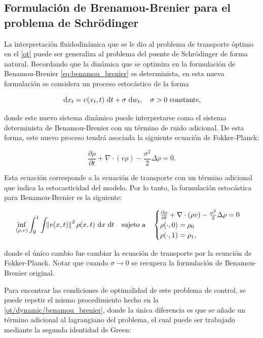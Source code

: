 \subsection{Formulación de Brenamou-Brenier para el problema de Schrödinger}
\label{eot_sbp/dynamic/schrodinger_equations}

La interpretación fluidodinámica que se le dio al problema de transporte óptimo en el \autoref{ot} puede ser generaliza al problema del puente de Schrödinger de forma natural. Recordando que la dinámica que se optimiza en la formulación de Benamou-Brenier \eqref{eq:benamou_brenier} es determinista, en esta nueva formulación se considera un proceso estocástico de la forma

\begin{equation*}
	\,\operatorname{d}\! x_t = v(x_t,t)\,\operatorname{d}\! t + \sigma\,\operatorname{d}\! w_t, \quad \sigma>0\text{ constante},
\end{equation*}

donde este nuevo sistema dinámico puede interpretarse como el sistema determinista de Benamou-Brenier con un término de ruido adicional. De esta forma, este nuevo proceso tendrá asociada la siguiente ecuación de Fokker-Planck:

\begin{equation*}
	\frac{\partial\rho}{\partial t} + \nabla\cdot(v\rho) - \frac{\sigma^2}{2}\Delta\rho = 0.
\end{equation*}

Esta ecuación corresponde a la ecuación de transporte con un término adicional que indica la estocasticidad del modelo. Por lo tanto, la formulación estocástica para Benamou-Brenier es la siguiente:

\begin{equation}
	\label{eq:benamou_brenier_sbp}
	\inf_{(\rho,v)} \int_0^1 \int_{} \left\lVert v(x,t) \right\rVert^2 \rho(x,t) \,\operatorname{d}\! x\,\operatorname{d}\! t
	\quad \text{sujeto a} \quad
	\begin{cases}
		\frac{\partial \rho}{\partial t} + \nabla\cdot(\rho v) - \frac{\sigma^2}{2}\Delta\rho = 0\\
		\rho(\cdot,0) = \rho_0\\
		\rho(\cdot,1) = \rho_1,
	\end{cases}
\end{equation}

donde el único cambio fue cambiar la ecuación de transporte por la ecuación de Fokker-Planck. Notar que cuando $\sigma\to 0$ se recupera la formulación de Benamou-Brenier original.

Para encontrar las condiciones de optimalidad de este problema de control, se puede repetir el mismo procedimiento hecho en la \autoref{ot/dynamic/benamou_brenier}, donde la única diferencia es que se añade un término adicional al lagrangiano del problema, el cual puede ser trabajado mediante la segunda identidad de Green:

